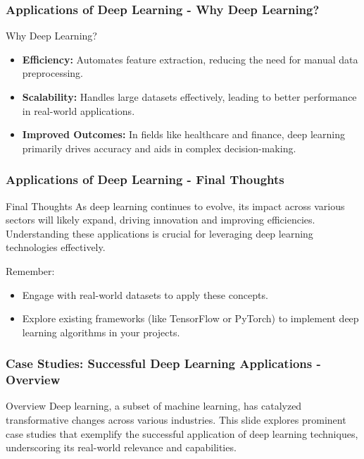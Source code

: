 \documentclass[aspectratio=169]{beamer}
\begin{document}
\begin{frame}[fragile]
  \frametitle{Applications of Deep Learning - Why Deep Learning?}
  \begin{block}{Why Deep Learning?}
      \begin{itemize}
          \item \textbf{Efficiency:} Automates feature extraction, reducing the need for manual data preprocessing.
          \item \textbf{Scalability:} Handles large datasets effectively, leading to better performance in real-world applications.
          \item \textbf{Improved Outcomes:} In fields like healthcare and finance, deep learning primarily drives accuracy and aids in complex decision-making.
      \end{itemize}
  \end{block}
\end{frame}

\begin{frame}[fragile]
  \frametitle{Applications of Deep Learning - Final Thoughts}
  \begin{block}{Final Thoughts}
      As deep learning continues to evolve, its impact across various sectors will likely expand, driving innovation and improving efficiencies. Understanding these applications is crucial for leveraging deep learning technologies effectively.
  \end{block}
  
  \begin{block}{Remember:}
      \begin{itemize}
          \item Engage with real-world datasets to apply these concepts.
          \item Explore existing frameworks (like TensorFlow or PyTorch) to implement deep learning algorithms in your projects.
      \end{itemize}
  \end{block}
\end{frame}

\begin{frame}[fragile]
    \frametitle{Case Studies: Successful Deep Learning Applications - Overview}
    \begin{block}{Overview}
        Deep learning, a subset of machine learning, has catalyzed transformative changes across various industries. 
        This slide explores prominent case studies that exemplify the successful application of deep learning techniques, underscoring its real-world relevance and capabilities.
    \end{block}
\end{frame}
\end{document}
